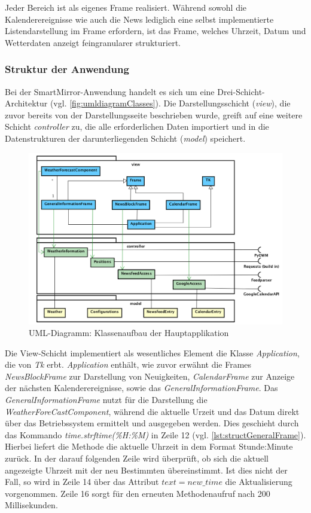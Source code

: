Jeder Bereich ist als eigenes Frame realisiert. Während sowohl die Kalenderereignisse wie auch die News lediglich eine selbst implementierte Listendarstellung im Frame erfordern, ist das Frame, welches Uhrzeit, Datum und Wetterdaten anzeigt feingranularer strukturiert.

 
\subsubsection*{Struktur der Anwendung}
\label{subsec:strukturAnwendung}
Bei der SmartMirror-Anwendung handelt es sich um eine Drei-Schicht-Architektur (vgl. \autoref{fig:umldiagramClasses})\cite{sharan2015model}. Die Darstellungsschicht (\textit{view}), die zuvor bereits von der Darstellungsseite  beschrieben wurde, greift auf eine weitere Schicht \textit{controller} zu, die alle erforderlichen Daten importiert und in die Datenstrukturen der darunterliegenden Schicht (\textit{model}) speichert.

\begin{figure}
	\centering
	\includegraphics[width=0.8\linewidth]{bilder/umlDiagram_v3}
	\caption[UML-Diagramm: Klassenaufbau der Hauptapplikation]{UML-Diagramm: Klassenaufbau der Hauptapplikation}
	\label{fig:umldiagramClasses}
\end{figure}

Die View-Schicht implementiert als wesentliches Element die Klasse \textit{Application}, die von \textit{Tk} erbt. 
\textit{Application} enthält, wie zuvor erwähnt die Frames \textit{NewsBlockFrame} zur Darstellung von Neuigkeiten, \textit{CalendarFrame} zur Anzeige der nächsten Kalenderereignisse, sowie das \textit{GeneralInformationFrame}. Das \textit{GeneralInformationFrame} nutzt für die Darstellung die \textit{WeatherForeCastComponent}, während die aktuelle Urzeit und das Datum direkt über das Betriebssystem ermittelt und ausgegeben werden. Dies geschieht durch das Kommando \textit{time.strftime(\grq \%H:\%M\grq)} in Zeile 12 (vgl. \autoref{lst:structGeneralFrame}). Hierbei liefert die Methode die aktuelle Uhrzeit in dem Format Stunde:Minute zurück. In der darauf folgenden Zeile wird überprüft, ob sich die aktuell angezeigte Uhrzeit mit der neu Bestimmten übereinstimmt. Ist dies nicht der Fall, so wird in Zeile 14 über das Attribut \textit{$text=new\_ time$} die Aktualisierung vorgenommen.
Zeile 16 sorgt für den erneuten Methodenaufruf nach 200 Millisekunden.

